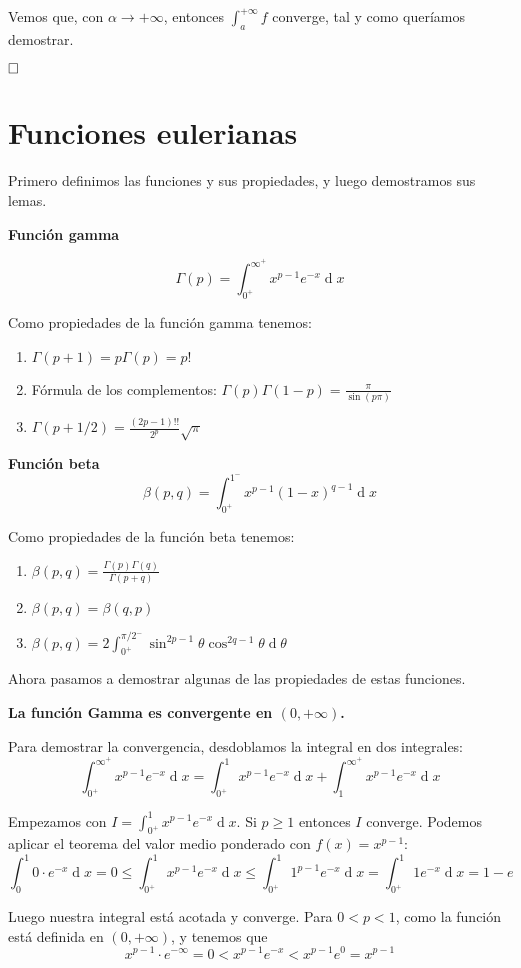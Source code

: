 \documentclass[a4paper]{article}
\renewcommand{\d}[1]{\ensuremath{\operatorname{d}\!{#1}}}
\newcommand{\qed}{\begin{flushright}
		{$\newline\square$}
	\end{flushright}}
\begin{document}
Vemos que, con $\alpha \rightarrow +\infty$, entonces $\int_a^{+\infty} f$ converge, tal y como queríamos demostrar. \qed

\section{Funciones eulerianas}

Primero definimos las funciones y sus propiedades, y luego demostramos sus lemas.

\textbf{Función gamma}

$$\Gamma(p) = \int_{0^+}^{\infty^+} x^{p-1} e^{-x} \d{x}$$

Como propiedades de la función gamma tenemos:
\begin{enumerate}
	\item $\Gamma(p+1) = p \Gamma(p) = p!$
	\item Fórmula de los complementos: $\Gamma(p)\Gamma(1-p) = \frac{\pi}{\sin(p\pi)}$
	\item $\Gamma(p + 1/2) = \frac{(2p-1)!!}{2^{p}}\sqrt{\pi}$
\end{enumerate}
\textbf{Función beta}
$$\beta(p,q) = \int_{0^+}^{1^-} x^{p-1}(1-x)^{q-1} \d x$$ 

Como propiedades de la función beta tenemos:
\begin{enumerate}
	\item $\beta(p,q) = \frac{\Gamma(p)\Gamma(q)}{\Gamma(p+q)}$
	\item $\beta(p,q) = \beta(q,p)$
	\item $\beta(p,q) = 2\int_{0^+}^{\pi/2^-} \sin^{2p-1} \theta \cos^{2q-1} \theta \d \theta$
\end{enumerate}

Ahora pasamos a demostrar algunas de las propiedades de estas funciones.

\textbf{La función Gamma es convergente en $(0,+\infty)$.}

Para demostrar la convergencia, desdoblamos la integral en dos integrales:
$$\int_{0^+}^{\infty^+} x^{p-1} e^{-x} \d{x} = \int_{0^+}^{1} x^{p-1} e^{-x} \d{x} + \int_{1}^{\infty^+} x^{p-1} e^{-x} \d{x}$$

Empezamos con $I = \int_{0^+}^{1} x^{p-1} e^{-x} \d{x}$. 
Si $p\ge 1$ entonces $I$ converge. Podemos aplicar el teorema del valor medio ponderado con $f(x) = x^{p-1}$:
$$\int_0^1 0\cdot e^{-x} \d x = 0 \le \int_{0^+}^{1} x^{p-1} e^{-x} \d{x} \le \int_{0^+}^{1} 1^{p-1} e^{-x} \d{x} = \int_{0^+}^{1} 1 e^{-x} \d{x} = 1-e$$

Luego nuestra integral está acotada y converge. Para $0 < p < 1$, como la función está definida en $(0, +\infty)$, y tenemos que 
$$x^{p-1}\cdot e^{-\infty} = 0 < x^{p-1}e^{-x} < x^{p-1}e^{0} = x^{p-1}$$
\end{document}
